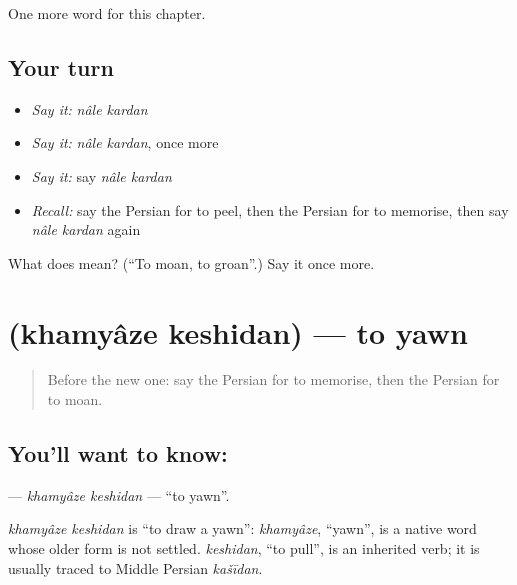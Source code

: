 \begin{grammarlens}[title={What you've built}]
One more word for this chapter.
\end{grammarlens}

\subsection*{Your turn}
\begin{itemize}
\raggedright
  \item \emph{Say it:} \emph{nâle kardan}
  \item \emph{Say it:} \emph{nâle kardan}, once more
  \item \emph{Say it:} say \emph{nâle kardan}
  \item \emph{Recall:} say the Persian for to peel, then the Persian for to memorise, then say \emph{nâle kardan} again
\end{itemize}

\begin{tcolorbox}[breakable,colback=teal!4,colframe=teal!35!black,title={Before you move on}]
What does   mean? (\textquotedblleft{}To moan, to groan\textquotedblright{}.) Say it once more.
\end{tcolorbox}
\section[\texorpdfstring{\fa{خمیازه} \fa{کشیدن} (khamyâze keshidan)}{خمیازه کشیدن (khamyâze keshidan)}]{  (khamyâze keshidan) — to yawn}

\label{lesson:FA-C225-khamyaze-keshidan}



\begin{quote}
Before the new one: say the Persian for to memorise, then the Persian for to moan.
\end{quote}

\subsection*{You'll want to know:  }
\textbf{ } — \emph{khamyâze keshidan} — \textquotedblleft{}to yawn\textquotedblright{}.

\begin{cousinweb}
\emph{khamyâze keshidan} is \textquotedblleft{}to draw a yawn\textquotedblright{}: \emph{khamyâze}, \textquotedblleft{}yawn\textquotedblright{}, is a native word whose older form is not settled. \emph{keshidan}, \textquotedblleft{}to pull\textquotedblright{}, is an inherited verb; it is usually traced to Middle Persian \emph{kašīdan}.
\end{cousinweb}

